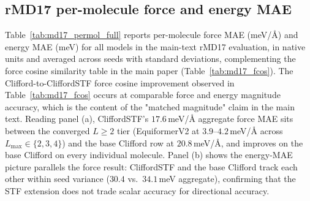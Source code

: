 \subsection{rMD17 per-molecule force and energy MAE}\label{supp:md17_permol}

Table~\ref{tab:md17_permol_full} reports per-molecule force MAE (meV/\AA) and energy MAE (meV) for all models in the main-text rMD17 evaluation, in native units and averaged across seeds with standard deviations, complementing the force cosine similarity table in the main paper (Table~\ref{tab:md17_fcos}). The Clifford-to-CliffordSTF force cosine improvement observed in Table~\ref{tab:md17_fcos} occurs at comparable force and energy magnitude accuracy, which is the content of the "matched magnitude" claim in the main text. Reading panel (a), CliffordSTF's $17.6$\,meV/\AA{} aggregate force MAE sits between the converged $L\!\geq\!2$ tier (EquiformerV2 at $3.9$--$4.2$\,meV/\AA{} across $L_{\max}\!\in\!\{2,3,4\}$) and the base Clifford row at $20.8$\,meV/\AA{}, and improves on the base Clifford on every individual molecule. Panel (b) shows the energy-MAE picture parallels the force result: CliffordSTF and the base Clifford track each other within seed variance ($30.4$ vs.\ $34.1$\,meV aggregate), confirming that the STF extension does not trade scalar accuracy for directional accuracy.

